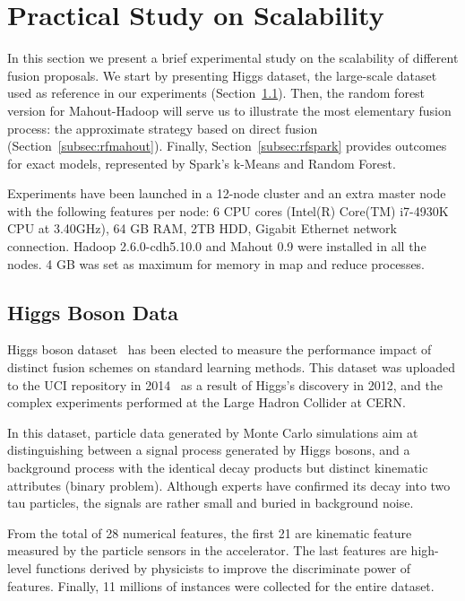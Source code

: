 \documentclass[3p,review]{elsarticle}
\begin{document}
	
	
	\section{Practical Study on Scalability}\label{sec:exp}
	
	In this section we present a brief experimental study on the scalability of different fusion proposals. We start by presenting Higgs dataset, the large-scale dataset used as reference in our experiments (Section~\ref{subsec:datasets}). Then, the random forest version for Mahout-Hadoop will serve us to illustrate the most elementary fusion process: the approximate strategy based on direct fusion (Section~\ref{subsec:rfmahout}). Finally, Section~\ref{subsec:rfspark} provides outcomes for exact models, represented by Spark's k-Means and Random Forest.
	
	Experiments have been launched in a 12-node cluster and an extra master node with the following features per node: 6 CPU cores (Intel(R) Core(TM) i7-4930K CPU at 3.40GHz), 64 GB RAM, 2TB HDD, Gigabit Ethernet network connection. Hadoop 2.6.0-cdh5.10.0 and Mahout 0.9 were installed in all the nodes. 4 GB was set as maximum for memory in map and reduce processes.
	
	\subsection{Higgs Boson Data}
	\label{subsec:datasets}
	
	Higgs boson dataset~\cite{baldi14} has been elected to measure the performance impact of distinct fusion schemes on standard learning methods. This dataset was uploaded to the UCI repository in 2014~\cite{Lichman:2013} as a result of Higgs's discovery in 2012, and the complex experiments performed at the Large Hadron Collider at CERN. %
	
	In this dataset, particle data generated by Monte Carlo simulations aim at distinguishing between a signal process generated by Higgs bosons, and a background process with the identical decay products but distinct kinematic attributes (binary problem). Although experts have confirmed its decay into two tau particles, the signals are rather small and buried in background noise. 
	
	From the total of 28 numerical features, the first 21 are kinematic feature measured by the particle sensors in the accelerator. The last features are high-level functions derived by physicists to improve the discriminate power of features. Finally, 11 millions of instances were collected for the entire dataset.
	
\end{document}
